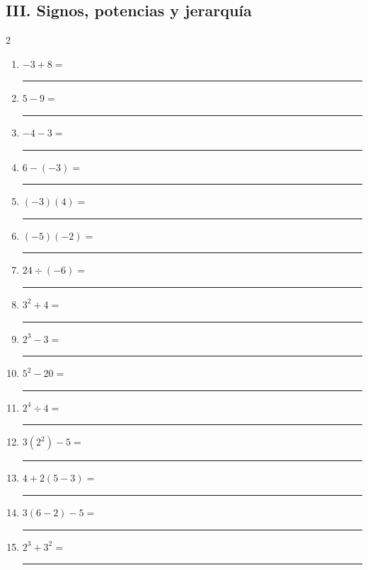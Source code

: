 \documentclass[11pt]{article}
\begin{document}
\subsection*{III. Signos, potencias y jerarquía}
\begin{multicols}{2}\begin{enumerate}[leftmargin=*,start=36]
\item $\displaystyle -3+8=$ \rule{2.1cm}{0.4pt}
\item $\displaystyle 5-9=$ \rule{2.1cm}{0.4pt}
\item $\displaystyle -4-3=$ \rule{2.1cm}{0.4pt}
\item $\displaystyle 6-(-3)=$ \rule{2.1cm}{0.4pt}
\item $\displaystyle (-3)(4)=$ \rule{2.1cm}{0.4pt}
\item $\displaystyle (-5)(-2)=$ \rule{2.1cm}{0.4pt}
\item $\displaystyle 24\div(-6)=$ \rule{2.1cm}{0.4pt}
\item $\displaystyle 3^2+4=$ \rule{2.1cm}{0.4pt}
\item $\displaystyle 2^3-3=$ \rule{2.1cm}{0.4pt}
\item $\displaystyle 5^2-20=$ \rule{2.1cm}{0.4pt}
\item $\displaystyle 2^4\div4=$ \rule{2.1cm}{0.4pt}
\item $\displaystyle 3(2^2)-5=$ \rule{2.1cm}{0.4pt}
\item $\displaystyle 4+2(5-3)=$ \rule{2.1cm}{0.4pt}
\item $\displaystyle 3(6-2)-5=$ \rule{2.1cm}{0.4pt}
\item $\displaystyle 2^3+3^2=$ \rule{2.1cm}{0.4pt}
\end{enumerate}\end{multicols}
\end{document}
